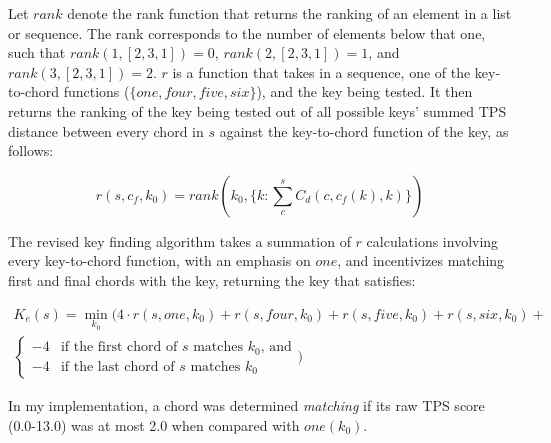 Let $rank$ denote the rank function that returns the ranking of an element in a list or sequence. The rank corresponds to the number of elements below that one, such that $rank(1, [2,3,1]) = 0$, $rank(2, [2,3,1]) = 1$, and $rank(3, [2,3,1]) = 2$. $r$ is a function that takes in a sequence, one of the key-to-chord functions ($\{one, four, five, six\}$), and the key being tested. It then returns the ranking of the key being tested out of all possible keys' summed TPS distance between every chord in $s$ against the key-to-chord function of the key, as follows:

\[ r(s,{c_f},k_0) = rank(k_0, \{k : \sum_c^s C_d(c,{c_f}(k),k)\}) \]

The revised key finding algorithm takes a summation of $r$ calculations involving every key-to-chord function, with an emphasis on $one$, and incentivizes matching first and final chords with the key, returning the key that satisfies:

\begin{multline*}
K_e(s) = \min_{k_0}\bigl( 4 \cdot r(s,one,k_0) + r(s,four,k_0) + r(s,five,k_0) + r(s,six,k_0) +\\ \begin{cases} -4 &\text{if the first chord of }s\text{ matches }k_0\text{, and} \\ -4 &\text{if the last chord of }s\text{ matches }k_0 \end{cases} \bigr)
\end{multline*}

In my implementation, a chord was determined \textit{matching} if its raw TPS score (0.0-13.0) was at most 2.0 when compared with $one(k_0)$.